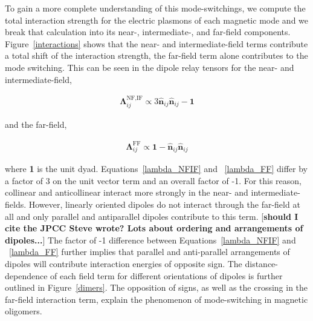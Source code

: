 \documentclass[journal=apchd5,manuscript=article]{achemso}
\begin{document}
To gain a more complete understanding of this mode-switchings, we compute the total interaction strength for the electric plasmons of each magnetic mode and we break that calculation into its near-, intermediate-, and far-field components. Figure~\ref{interactions} shows that the near- and intermediate-field terms contribute a total shift of the interaction strength, the far-field term alone contributes to the mode switching. This can be seen in the dipole relay tensors for the near- and intermediate-field,

\begin{equation}
\begin{aligned}
\boldsymbol{\Lambda}_{ij}^{\textrm{NF,IF}} \propto 3\hat{\textbf{n}}_{ij}\hat{\textbf{n}}_{ij} -\textbf{1}
\label{lambda_NFIF}
\end{aligned}
\end{equation}

\noindent and the far-field,

\begin{equation}
\begin{aligned}
\boldsymbol{\Lambda}_{ij}^{\textrm{FF}} \propto \textbf{1}-\hat{\textbf{n}}_{ij}\hat{\textbf{n}}_{ij}
\label{lambda_FF}
\end{aligned}
\end{equation}

\noindent where \textbf{1} is the unit dyad. Equations~\ref{lambda_NFIF} and ~\ref{lambda_FF} differ by a factor of 3 on the unit vector term and an overall factor of -1. For this reason, collinear and anticollinear interact more strongly in the near- and intermediate-fields. However, linearly oriented dipoles do not interact through the far-field at all and only parallel and antiparallel dipoles contribute to this term. [\textbf{should I cite the JPCC Steve wrote? Lots about ordering and arrangements of dipoles...}] The factor of -1 difference between Equations~\ref{lambda_NFIF} and ~\ref{lambda_FF} further implies that parallel and anti-parallel arrangements of dipoles will contribute interaction energies of opposite sign. The distance-dependence of each field term for different orientations of dipoles is further outlined in Figure~\ref{dimers}. The opposition of signs, as well as the crossing in the far-field interaction term, explain the phenomenon of mode-switching in magnetic oligomers.
\end{document}
